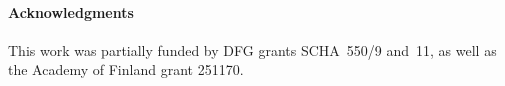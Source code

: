 \paragraph{Acknowledgments}

This work was partially funded by DFG grants SCHA~550/9 and~11,
as well as the Academy of Finland grant 251170.


